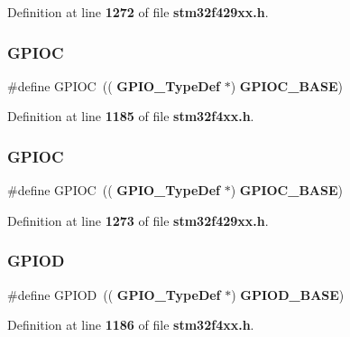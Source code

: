 Definition at line \textbf{ 1272} of file \textbf{ stm32f429xx.\+h}.

\mbox{\label{group__Peripheral__declaration_ga2dca03332d620196ba943bc2346eaa08}} 
\subsubsection{G\+P\+I\+OC\hspace{0.1cm}{\footnotesize\ttfamily [1/2]}}
{\footnotesize\ttfamily \#define G\+P\+I\+OC~((\textbf{ G\+P\+I\+O\+\_\+\+Type\+Def} $\ast$) \textbf{ G\+P\+I\+O\+C\+\_\+\+B\+A\+SE})}



Definition at line \textbf{ 1185} of file \textbf{ stm32f4xx.\+h}.

\mbox{\label{group__Peripheral__declaration_ga2dca03332d620196ba943bc2346eaa08}} 
\subsubsection{G\+P\+I\+OC\hspace{0.1cm}{\footnotesize\ttfamily [2/2]}}
{\footnotesize\ttfamily \#define G\+P\+I\+OC~((\textbf{ G\+P\+I\+O\+\_\+\+Type\+Def} $\ast$) \textbf{ G\+P\+I\+O\+C\+\_\+\+B\+A\+SE})}



Definition at line \textbf{ 1273} of file \textbf{ stm32f429xx.\+h}.

\mbox{\label{group__Peripheral__declaration_ga7580b1a929ea9df59725ba9c18eba6ac}} 
\subsubsection{G\+P\+I\+OD\hspace{0.1cm}{\footnotesize\ttfamily [1/2]}}
{\footnotesize\ttfamily \#define G\+P\+I\+OD~((\textbf{ G\+P\+I\+O\+\_\+\+Type\+Def} $\ast$) \textbf{ G\+P\+I\+O\+D\+\_\+\+B\+A\+SE})}



Definition at line \textbf{ 1186} of file \textbf{ stm32f4xx.\+h}.

